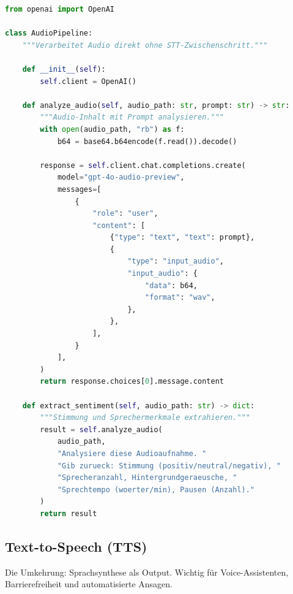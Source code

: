 \begin{lstlisting}[language=Python, caption=Direkte Audio-Verarbeitung (GPT-4o-Audio)]
from openai import OpenAI

class AudioPipeline:
    """Verarbeitet Audio direkt ohne STT-Zwischenschritt."""

    def __init__(self):
        self.client = OpenAI()

    def analyze_audio(self, audio_path: str, prompt: str) -> str:
        """Audio-Inhalt mit Prompt analysieren."""
        with open(audio_path, "rb") as f:
            b64 = base64.b64encode(f.read()).decode()

        response = self.client.chat.completions.create(
            model="gpt-4o-audio-preview",
            messages=[
                {
                    "role": "user",
                    "content": [
                        {"type": "text", "text": prompt},
                        {
                            "type": "input_audio",
                            "input_audio": {
                                "data": b64,
                                "format": "wav",
                            },
                        },
                    ],
                }
            ],
        )
        return response.choices[0].message.content

    def extract_sentiment(self, audio_path: str) -> dict:
        """Stimmung und Sprechermerkmale extrahieren."""
        result = self.analyze_audio(
            audio_path,
            "Analysiere diese Audioaufnahme. "
            "Gib zurueck: Stimmung (positiv/neutral/negativ), "
            "Sprecheranzahl, Hintergrundgeraeusche, "
            "Sprechtempo (woerter/min), Pausen (Anzahl)."
        )
        return result
\end{lstlisting}

\subsection{Text-to-Speech (TTS)}

Die Umkehrung: Sprachsynthese als Output. Wichtig für Voice-Assistenten, Barrierefreiheit und automatisierte Ansagen.

